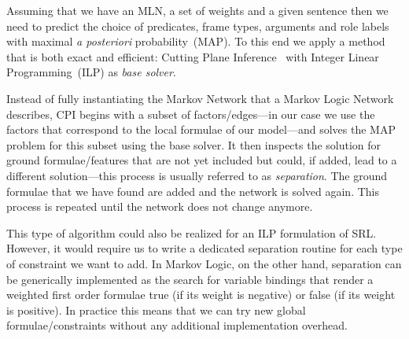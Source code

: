



Assuming that we have an MLN, a set of weights and a given sentence then we need to predict the choice of predicates, frame types, arguments and role labels with maximal \emph{a posteriori} probability~(MAP). To this end we apply a method that is both exact and efficient: Cutting Plane Inference~\cite[CPI,][]{riedel08improving} with Integer Linear Programming~(ILP) as \emph{base solver}. 

Instead of fully instantiating the Markov Network that a Markov Logic Network describes, CPI begins with a subset of factors/edges---in our case we use the factors that correspond to the local formulae of our model---and solves the MAP problem for this subset using the base solver. It then inspects the solution for ground formulae/features that are not yet included but could, if added, lead to a different solution---this process is usually referred to as \emph{separation}. The ground formulae that we have found are added and the network is solved again. This process is repeated until the network does not change anymore.

This type of algorithm could also be realized for an ILP formulation of SRL. However, it would require us to write a dedicated separation routine for each type of constraint we want to add. In Markov Logic, on the other hand, separation can be generically implemented as the search for variable bindings that render a weighted first order formulae true (if its weight is negative) or false (if its weight is positive). In practice this means that we can try new global formulae/constraints without any additional implementation overhead.   

